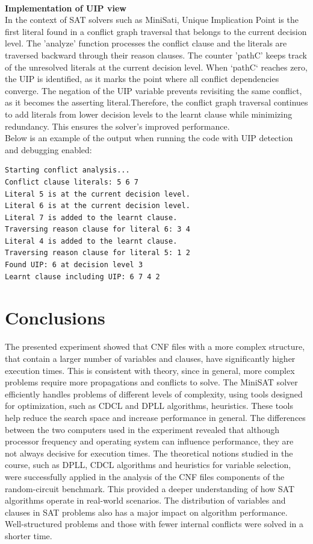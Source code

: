 \documentclass[runningheads]{llncs}
\begin{document}
\\
\textbf{Implementation of UIP view}
\\
In the context of SAT solvers such as MiniSati, Unique Implication Point is the first literal found in a conflict graph traversal that belongs to the current decision level. The 'analyze' function processes the conflict clause and the literals are traversed backward through their reason clauses. The counter 'pathC' keeps track of the unresolved literals at the current decision level. When `pathC` reaches zero, the UIP is identified, as it marks the point where all conflict dependencies converge. The negation of the UIP variable prevents revisiting the same conflict, as it becomes the asserting literal.Therefore, the conflict graph traversal continues to add literals from lower decision levels to the learnt clause while minimizing redundancy. This ensures the solver's improved performance. 
\\
Below is an example of the output when running the code with UIP detection and debugging enabled:
\begin{verbatim}
Starting conflict analysis...
Conflict clause literals: 5 6 7
Literal 5 is at the current decision level.
Literal 6 is at the current decision level.
Literal 7 is added to the learnt clause.
Traversing reason clause for literal 6: 3 4
Literal 4 is added to the learnt clause.
Traversing reason clause for literal 5: 1 2
Found UIP: 6 at decision level 3
Learnt clause including UIP: 6 7 4 2
\end{verbatim}

\section{Conclusions}

   The presented experiment showed that CNF files with a more complex structure, that contain a larger number of variables and clauses, have significantly higher execution times. This is consistent with theory, since in general, more complex problems require more propagations and conflicts to solve. The MiniSAT solver efficiently handles problems of different levels of complexity, using tools designed for optimization, such as CDCL and DPLL algorithms, heuristics. These tools help reduce the search space and increase performance in general. The differences between the two computers used in the experiment revealed that although processor frequency and operating system can influence performance, they are not always decisive for execution times.  The theoretical notions studied in the course, such as DPLL, CDCL algorithms and heuristics for variable selection, were successfully applied in the analysis of the CNF files components of the random-circuit benchmark. This provided a deeper understanding of how SAT algorithms operate in real-world scenarios. The distribution of variables and clauses in SAT problems also has a major impact on algorithm performance. Well-structured problems and those with fewer internal conflicts were solved in a shorter time.
\end{document}
